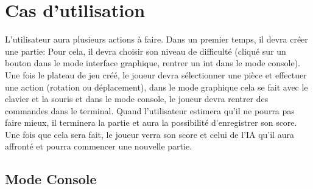 \documentclass[12pt]{article}
\begin{document}
\section{Cas d'utilisation}


L'utilisateur aura plusieurs actions à faire. Dans un premier temps, il devra créer une partie: Pour cela, il devra choisir son niveau de difficulté (cliqué sur un bouton dans le mode interface graphique, rentrer un int dans le mode console). Une fois le plateau de jeu créé, le joueur devra sélectionner une pièce et effectuer une action (rotation ou déplacement), dans le mode graphique cela se fait avec le clavier et la souris et dans le mode console, le joueur devra rentrer des commandes dans le terminal. Quand l'utilisateur estimera qu'il ne pourra pas faire mieux, il terminera la partie et aura la possibilité d'enregistrer son score. Une fois que cela sera fait, le joueur verra son score et celui de l'IA qu'il aura affronté et pourra commencer une nouvelle partie.

\subsection{Mode Console}
\end{document}
